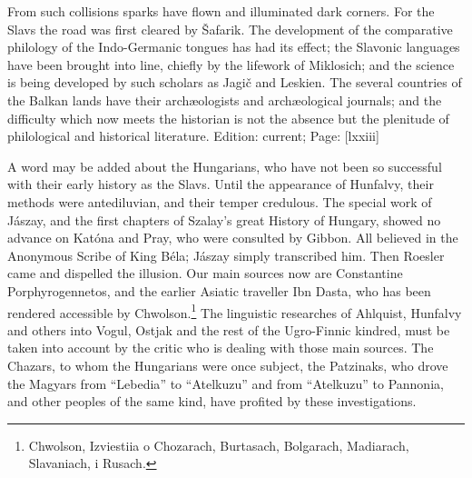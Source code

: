 From such collisions sparks have flown and illuminated dark corners. For the Slavs the road was first cleared by Šafarik. The development of the comparative philology of the Indo-Germanic tongues has had its effect; the Slavonic languages have been brought into line, chiefly by the lifework of Miklosich; and the science is being developed by such scholars as Jagič and Leskien. The several countries of the Balkan lands have their archæologists and archæological journals; and the difficulty which now meets the historian is not the absence but the plenitude of philological and historical literature.
Edition: current; Page: [lxxiii]

A word may be added about the Hungarians, who have not been so successful with their early history as the Slavs. Until the appearance of Hunfalvy, their methods were antediluvian, and their temper credulous. The special work of Jászay, and the first chapters of Szalay\texthebrew{}’s great History of Hungary, showed no advance on Katóna and Pray, who were consulted by Gibbon. All believed in the Anonymous Scribe of King Béla; Jászay simply transcribed him. Then Roesler came and dispelled the illusion. Our main sources now are Constantine Porphyrogennetos, and the earlier Asiatic traveller Ibn Dasta, who has been rendered accessible by Chwolson.\footnote{Chwolson, Izviestiia o Chozarach, Burtasach, Bolgarach, Madiarach, Slavaniach, i Rusach.} The linguistic researches of Ahlquist, Hunfalvy and others into Vogul, Ostjak and the rest of the Ugro-Finnic kindred, must be taken into account by the critic who is dealing with those main sources. The Chazars, to whom the Hungarians were once subject, the Patzinaks, who drove the Magyars from \texthebrew{“}Lebedia\texthebrew{}” to \texthebrew{“}Atelkuzu\texthebrew{}” and from \texthebrew{“}Atelkuzu\texthebrew{}” to Pannonia, and other peoples of the same kind, have profited by these investigations.

